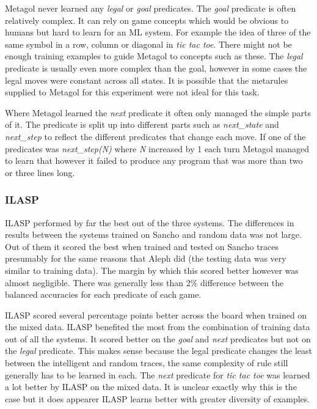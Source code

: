 Metagol never learned any \textit{legal} or \textit{goal} predicates. The \textit{goal} predicate is often relatively complex. It can rely on game concepts which would be obvious to humans but hard to learn for an ML system. For example the idea of three of the same symbol in a row, column or diagonal in \textit{tic tac toe}. There might not be enough training examples to guide Metagol to concepts such as these. The \textit{legal} predicate is usually even more complex than the goal, however in some cases the legal moves were constant across all states. It is possible that the metarules supplied to Metagol for this experiment were not ideal for this task.

Where Metagol learned the \textit{next} predicate it often only managed the simple parts of it. The predicate is split up into different parts such as \textit{next\_state} and \textit{next\_step} to reflect the different predicates that change each move. If one of the predicates was \textit{next\_step(N)} where \textit{N} increased by 1 each turn Metagol managed to learn that however it failed to produce any program that was more than two or three lines long.

\subsubsection{ILASP}
ILASP performed by far the best out of the three systems. The differences in results between the systems trained on Sancho and random data was not large. Out of them it scored the best when trained and tested on Sancho traces presumably for the same reasons that Aleph did (the testing data was very similar to training data). The margin by which this scored better however was almost negligible. There was generally less than 2\% difference between the balanced accuracies for each predicate of each game.

ILASP scored several percentage points better across the board when trained on the mixed data. ILASP benefited the most from the combination of training data out of all the systems. It scored better on the \textit{goal} and \textit{next} predicates but not on the \textit{legal} predicate. This makes sense because the legal predicate changes the least between the intelligent and random traces, the same complexity of rule still generally has to be learned in each. The \textit{next} predicate for \textit{tic tac toe} was learned a lot better by ILASP on the mixed data. It is unclear exactly why this is the case but it does appearer ILASP learns better with greater diversity of examples. 


